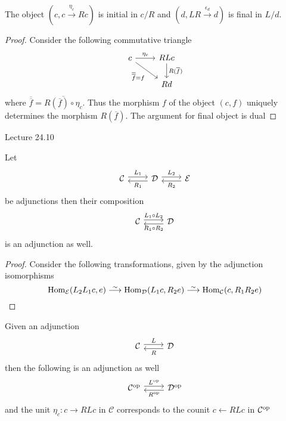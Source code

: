 \begin{prop}
\label{initial_final_comma_category}
    The object $(c,c \xrightarrow{\eta_c} Rc)$ is initial in $c/R$ and
    $(d, LR \xrightarrow{\epsilon_d} d)$ is final in $L/d$.
\end{prop}

\begin{proof}
    Consider the following commutative triangle
        \[
        \begin{tikzcd}
            c 
            \arrow[r, " \eta_c "] 
            \arrow[rd, "\overline{\overline{f}}=f"']
            &
            RLc
            \arrow[d,"R(\overline{f})"]
            \\
            &
            Rd
        \end{tikzcd}
        \]
    where $\overline{\overline{f}}=\overline{R(\overline{f})\circ \eta_c}$. 
    Thus the morphism $f$ of the object $(c,f)$ uniquely determines the morphism $R(\overline{f})$. 
    The argument for final object is dual
\end{proof}

Lecture 24.10

\begin{prop}
    Let 
    \[
    \begin{tikzcd}
        \mathcal{C}
        \arrow[r, shift left, "L_1"]
        &
        \mathcal{D}
        \arrow[l, shift left, "R_1"]
        \arrow[r, shift left, "L_2"]
        &
        \mathcal{E}
        \arrow[l, shift left, "R_2"]
    \end{tikzcd}
    \]
    be adjunctions then their composition
    \[
    \begin{tikzcd}
        \mathcal{C}
        \arrow[r, shift left, "L_1\circ L_2"]
        &
        \mathcal{D}
        \arrow[l, shift left, "R_1\circ R_2"]
    \end{tikzcd}
    \]
    is an adjunction as well.
\end{prop}

\begin{proof}
Consider the following transformations, given by the adjunction isomorphisms
    \[
    \Hom_{\mathcal{E}}(L_2L_1c,e) \isomorphism \Hom_{\mathcal{D}}(L_1c,R_2e) \isomorphism \Hom_{\mathcal{C}}(c,R_1R_2e)
    \]
\end{proof}

\begin{rmk}
    Given an adjunction 
    \[
    \begin{tikzcd}
        \mathcal{C}
        \arrow[r, shift left, "L"]
        &
        \mathcal{D}
        \arrow[l, shift left, "R"]
    \end{tikzcd}
    \]
    then the following is an adjunction as well
    \[
    \begin{tikzcd}
        \mathcal{C^{\op}}
        \arrow[r, shift left, "L^{\op}"]
        &
        \mathcal{D^{\op}}
        \arrow[l, shift left, "R^{\op}"]
    \end{tikzcd}
    \]
    and the unit $\eta_c\colon c \to RLc$ in $\mathcal{C}$ corresponds to the counit $c \xleftarrow{}RLc$ in $\mathcal{C}^{\operatorname{op}}$
\end{rmk}

